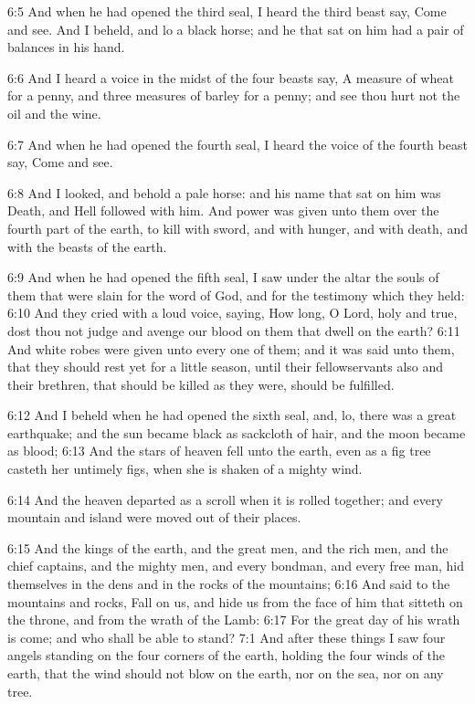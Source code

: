 6:5 And when he had opened the third seal, I heard the third beast say, Come and see. And I beheld, and lo a black horse; and he that sat on him had a pair of balances in his hand.

6:6 And I heard a voice in the midst of the four beasts say, A measure of wheat for a penny, and three measures of barley for a penny; and see thou hurt not the oil and the wine.

6:7 And when he had opened the fourth seal, I heard the voice of the fourth beast say, Come and see.

6:8 And I looked, and behold a pale horse: and his name that sat on him was Death, and Hell followed with him. And power was given unto them over the fourth part of the earth, to kill with sword, and with hunger, and with death, and with the beasts of the earth.

6:9 And when he had opened the fifth seal, I saw under the altar the souls of them that were slain for the word of God, and for the testimony which they held: 6:10 And they cried with a loud voice, saying, How long, O Lord, holy and true, dost thou not judge and avenge our blood on them that dwell on the earth?  6:11 And white robes were given unto every one of them; and it was said unto them, that they should rest yet for a little season, until their fellowservants also and their brethren, that should be killed as they were, should be fulfilled.

6:12 And I beheld when he had opened the sixth seal, and, lo, there was a great earthquake; and the sun became black as sackcloth of hair, and the moon became as blood; 6:13 And the stars of heaven fell unto the earth, even as a fig tree casteth her untimely figs, when she is shaken of a mighty wind.

6:14 And the heaven departed as a scroll when it is rolled together; and every mountain and island were moved out of their places.

6:15 And the kings of the earth, and the great men, and the rich men, and the chief captains, and the mighty men, and every bondman, and every free man, hid themselves in the dens and in the rocks of the mountains; 6:16 And said to the mountains and rocks, Fall on us, and hide us from the face of him that sitteth on the throne, and from the wrath of the Lamb: 6:17 For the great day of his wrath is come; and who shall be able to stand?  7:1 And after these things I saw four angels standing on the four corners of the earth, holding the four winds of the earth, that the wind should not blow on the earth, nor on the sea, nor on any tree.

